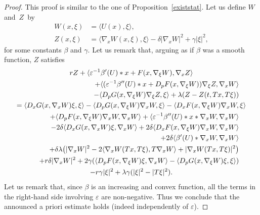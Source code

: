 \documentclass[10pt]{amsart}
\let\epsilon\varepsilon
\theoremstyle{definition}
\begin{document}
\begin{proof}
This proof is similar to the one of Proposition~\ref{existstat}. Let us define $W$ and~$Z$~by
\begin{align*}
W(x,\xi) &= \langle U(x),\xi\rangle,\\
Z(x,\xi) &= \langle \nabla_x W (x, \xi), \xi\rangle-\delta |\nabla_x W|^2+\gamma |\xi|^2,
\end{align*}
for some constants $\beta$ and $\gamma$. Let us remark that, arguing as if $\beta$ was a smooth function, $Z$ satisfies\vspace*{-5pt}
\begin{multline}\label{Zedppenal}
 r Z+\langle \epsilon^{-1}\beta'(U)*x+F(x,\nabla_{\xi} W), \nabla_x Z\rangle\\
\shoveright{ +\langle (\epsilon^{-1}\beta''(U)*x+D_p F (x,\nabla_{\xi} W)) \nabla_{\xi}Z , \nabla_{x} W\rangle}\\
\shoveright{- \langle D_p G(x, \nabla_{\xi}W)\nabla_{\xi}Z, \xi\rangle+\lambda(Z- Z(t,Tx, T\xi))}\\
 = \langle D_xG(x, \nabla_x W) \xi, \xi\rangle-\langle D_pG(x, \nabla_{\xi}W) \nabla_x W, \xi\rangle-\langle D_x F(x, \nabla_{\xi} W) \nabla_x W, \xi\rangle \\
\shoveright{+ \langle D_p F(x, \nabla_{\xi}W) \nabla_x W, \nabla_x W\rangle+\langle \epsilon^{-1} \beta''(U)*x*\nabla_x W, \nabla_x W\rangle}\\
\shoveright{- 2 \delta \langle D_x G(x, \nabla_x W)\xi, \nabla_x W\rangle
+2 \delta \langle D_x F(x, \nabla_{\xi} W) \nabla_x W, \nabla_x W\rangle}\\
\shoveright{+2 \delta \langle \beta'(U)*\nabla_x W, \nabla_x W\rangle}\\
\shoveright{+\delta \lambda \bigl(|\nabla_x W|^2-2 \langle \nabla_x W(Tx, T \xi), T \nabla_x W\rangle+| \nabla_x W(Tx, T \xi)|^2 \bigr)} \\
\shoveright{+r \delta |\nabla_x W|^2+2 \gamma(\langle D_p F (x,\nabla_{\xi} W) \xi , \nabla_{x} W\rangle-\langle D_p G(x, \nabla_{\xi}W)\xi, \xi\rangle)}\\
 -r\gamma |\xi|^2+\lambda \gamma (|\xi|^2-|T\xi|^2).
\end{multline}
Let us remark that, since $\beta$ is an increasing and convex function, all the terms in the right-hand side involving $\epsilon$ are non-negative. Thus we conclude that the announced a priori estimate holds (indeed independently of $\epsilon$).
\end{proof}
\end{document}

